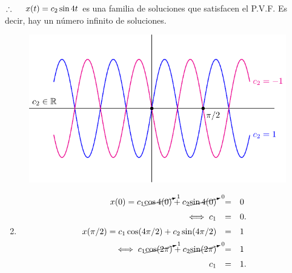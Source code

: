 \documentclass{beamer}
\begin{document}
\begin{frame}[t]
	\begin{exampleblock}{}
		\(\therefore \hspace{5mm} x(t) = c_2 \sin 4t\) es una familia de soluciones que satisfacen el P.V.F. Es decir, hay un número infinito de soluciones.
		\begin{figure}[hbtp!]
			\centering
			\includegraphics[width= 0.5 \linewidth]{IMAGENES/7/tikz.pdf}
		\end{figure}
		\begin{enumerate}
			\setcounter{enumi}{1}
		\item \vspace{-5mm}
			\[
				\begin{array}{rcl}
					x(0) = c_1 \cancelto{1}{\cos 4(0)} + c_2 \cancelto{0}{\sin 4(0)} & = & 0 \\[2mm]
					\iff c_1 & = & 0.\\[2mm]
					x(\pi /2) = c_1 \cos (4 \pi /2) + c_2 \sin (4 \pi /2) & = & 1 \\[2mm]
					\iff c_1 \cancelto{1}{\cos (2 \pi)} + c_2 \cancelto{0}{\sin (2 \pi)} & = & 1 \\[2mm]
					c_1 & = & 1.
				\end{array}
			\]
		\end{enumerate}
	\end{exampleblock}
\end{frame}
\end{document}
